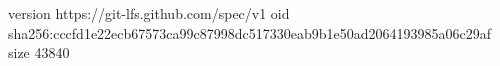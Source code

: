 version https://git-lfs.github.com/spec/v1
oid sha256:cccfd1e22ecb67573ca99c87998dc517330eab9b1e50ad2064193985a06c29af
size 43840
